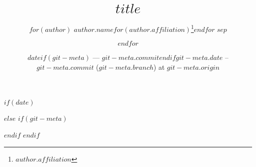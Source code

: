 %

\title{$title$}
\author{%
    $for(author)$
    $author.name$$for(author.affiliation)$\thanks{$author.affiliation$}$endfor$
    $sep$ \and
    $endfor$
}


$if(date)$
\date{$date$$if(git-meta)$ --- $git-meta.commit$$endif$}
$else$
$if(git-meta)$
\date{$git-meta.date$ -- $git-meta.commit$ ($git-meta.branch$) at $git-meta.origin$}
$endif$
$endif$


\newcommand{\makeabstract}{
\begin{abstract}
$if(abstract)$
    $abstract$
$else$
    Please write an abstract in the \texttt{paper-meta.yaml} file.
$endif$
\end{abstract}
}
